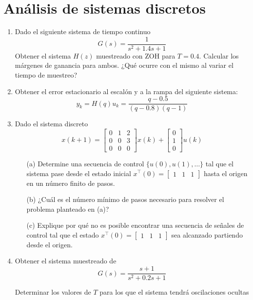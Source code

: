 \documentclass[a4paper,12pt]{article}
\begin{document}
\section{Análisis de sistemas discretos}
\begin{enumerate}
	\item Dado el siguiente sistema de tiempo continuo
	      \[G(s) = \frac{1}{s^2+1.4s+1}\]
	      Obtener el sistema $H(z)$ muestreado con ZOH para $T=0.4$. Calcular los márgenes de ganancia para ambos. ¿Qué ocurre con el mismo al variar el tiempo de muestreo?

	\item Obtener el error estacionario al escalón y a la rampa del siguiente sistema:
	      \[y_k = H(q) u_k = \frac{q-0.5}{(q-0.8)(q-1)} \]

	\item Dado el sistema discreto
	      \[
		      x(k+1)=\begin{bmatrix}
			      0 & 1 & 2 \\ 0& 0 & 3 \\ 0&0&0
		      \end{bmatrix}x(k)+\begin{bmatrix}
			      0 \\ 1 \\ 0
		      \end{bmatrix}
		      u(k)
	      \]

	      \begin{enumerate}
		      \item[(a)] Determine una secuencia de control $\{u(0),u(1),\dots\}$ tal que el sistema pase desde el estado inicial \(x^{\top}(0)=\begin{bmatrix}1 & 1 & 1\end{bmatrix}\) hasta el origen en un número finito de pasos.
		      \item[(b)] ¿Cuál es el número mínimo de pasos necesario para resolver el problema planteado en (a)?
		      \item[(c)] Explique por qué no es posible encontrar una secuencia de señales de control tal que el estado \(x^{\top}(0)=\begin{bmatrix} 1 & 1 & 1\end{bmatrix}\)
		            sea alcanzado partiendo desde el origen.
	      \end{enumerate}

	\item Obtener el sistema muestreado de
	      \[ G(s)=\frac{s+1}{s^2+0.2s+1}\]

	      Determinar los valores de $T$ para los que el sistema tendrá oscilaciones ocultas
\end{enumerate}
\end{document}
